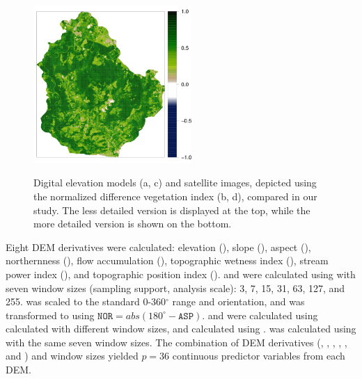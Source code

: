 \begin{figure}[!ht]
\begin{minipage}[b]{63mm}
    \end{minipage}
    \begin{minipage}[b]{63mm}
      \label{fig:sat-new}
      \centering
      \includegraphics[width=60mm]{chap01FIG4d}
    \end{minipage}
  \caption{Digital elevation models (a, c) and satellite images, depicted using   the normalized difference 
vegetation index (b, d), compared in our study. The less detailed version is displayed at the top, while the 
more detailed version is shown on the bottom.}
  \label{fig:con-covars}
\end{figure}

Eight DEM derivatives were calculated: elevation (\elev), slope (\slp), aspect (\asp), northernness (\nor), 
flow accumulation (\acc), topographic wetness index (\twi), stream power index (\spi), and topographic 
position index (\tpi). \slp{} and \asp{} were calculated using  with seven window sizes 
(sampling support, analysis scale): 3, 7, 15, 31, 63, 127, and 255. \asp{} was scaled to the standard 
0-360$^\circ$ range and orientation, and was transformed to \nor{} using $\texttt{NOR} = abs(180^\circ - 
\texttt{ASP})$. \twi{} and \spi{} were calculated using \slp{} calculated with different window sizes, and 
\acc{} calculated using . \tpi{} was calculated using  with the same 
seven window sizes. The combination of DEM derivatives (\elev, \slp, \nor, \twi, \spi, and \tpi) and window 
sizes yielded $p=36$ continuous predictor variables from each DEM.

